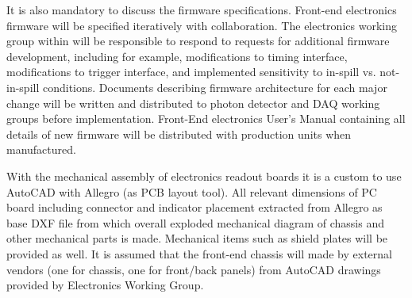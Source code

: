 It is also mandatory to discuss the firmware specifications. Front-end electronics firmware will be specified iteratively with collaboration. The electronics working group within will be responsible to respond to requests for additional firmware development, including for example, modifications to timing interface, modifications to trigger interface, and implemented sensitivity to in-spill vs. not-in-spill conditions. Documents describing firmware architecture for each major change will be written and distributed to photon detector and DAQ working groups before implementation. Front-End electronics User's Manual containing all details of new firmware will be distributed with production units when manufactured.

With the mechanical assembly of electronics readout boards it is a custom to use  AutoCAD with Allegro (as PCB layout tool). All relevant dimensions of PC board including connector and indicator placement extracted from Allegro as base DXF file from which overall exploded mechanical diagram of chassis and other mechanical parts is made. Mechanical items such as shield plates will be provided as well. It is assumed that the front-end chassis will made by external vendors (one for chassis, one for front/back panels) from AutoCAD drawings provided by Electronics Working Group.




